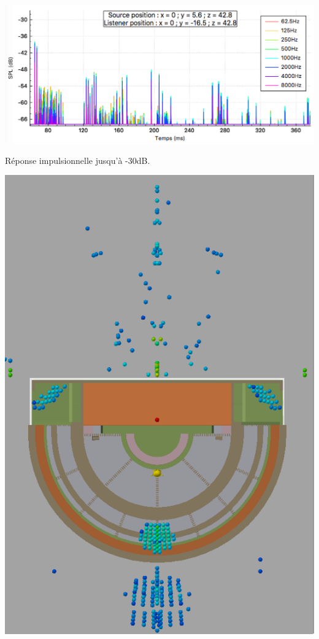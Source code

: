 \addtocounter{footnote}{1}
% 
\begin{figureth}
	\begin{subfigureth}{\linewidth}
		\includegraphics[width=0.85\linewidth]{images/rirTheatre30}
		\caption{Réponse impulsionnelle jusqu'à -30dB.}
		\label{rirTheatre30}
	\end{subfigureth}
	\begin{subfigureth}{0.36\textwidth}
		\includegraphics[width=\linewidth]{images/SI30dBbis}

\end{subfigureth}
\end{figureth}
